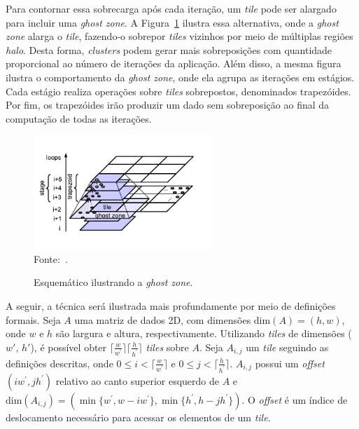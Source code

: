 Para contornar essa sobrecarga após cada iteração, um \textit{tile} pode ser
alargado para incluir uma \textit{ghost zone}. A Figura~\ref{fig:tiling} ilustra
essa alternativa, onde a \textit{ghost zone} alarga o \textit{tile}, fazendo-o
sobrepor \textit{tiles} vizinhos por meio de múltiplas regiões \textit{halo}.
Desta forma, \textit{clusters} podem gerar mais sobreposições com quantidade proporcional ao
número de iterações da aplicação. Além disso, a mesma figura ilustra o
comportamento da \textit{ghost zone}, onde ela agrupa as iterações em estágios.
Cada estágio realiza operações sobre \textit{tiles} sobrepostos, denominados
trapezóides. Por fim, os trapezóides irão produzir um dado sem sobreposição ao
final da computação de todas as iterações.

\begin{figure}[!h]
	\centering
    \caption{Esquemático ilustrando a \textit{ghost zone}.}
    \includegraphics[width=0.6\textwidth]{figs/tiling.pdf} \\
    Fonte:~\cite{meng11}.
    \label{fig:tiling}
\end{figure}



A seguir, a técnica será ilustrada mais profundamente
por meio de definições formais. Seja $A$ uma matriz de dados 2D, com dimensões
$\textrm{dim}(A) = (h,w)$, onde $w$ e $h$ são largura e altura, respectivamente.
Utilizando \textit{tiles} de dimensões ($w'$, $h'$), é possível obter
$\lceil\frac{w}{w^\prime}\rceil\lceil\frac{h}{h^\prime}\rceil$ \textit{tiles}
sobre $A$. Seja $A_{i,j}$ um \textit{tile} seguindo as definições descritas,
onde $0 \leq i < \lceil\frac{w}{w^\prime}\rceil$ e $0\leq j <
\lceil\frac{h}{h^\prime}\rceil$. $A_{i,j}$ possui um \textit{offset} $(i
w^\prime, j h^\prime)$ relativo ao canto superior esquerdo de $A$ e
$\textrm{dim}(A_{i,j}) = (\min\{w^\prime, w-i w^\prime\}, \min\{h^\prime, h-j
h^\prime\})$. O \textit{offset} é um índice de deslocamento necessário para
acessar os elementos de um \textit{tile}.

